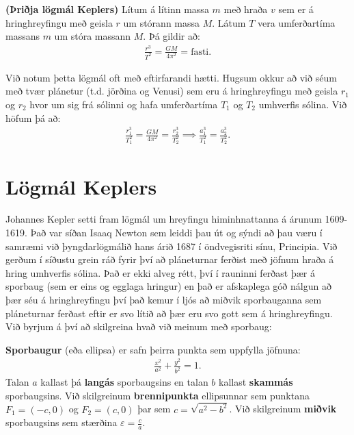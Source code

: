 \ifdefined \wholebook \else\documentclass[oneside]{book}\usepackage{EdlBook}\graphicspath{{figures/}}
\begin{document}
\begin{tcolorbox}
\begin{theorem}
    \textbf{(Þriðja lögmál Keplers)} Lítum á lítinn massa $m$ með hraða $v$ sem er á hringhreyfingu með geisla $r$ um stórann massa $M$. Látum $T$ vera umferðartíma massans $m$ um stóra massann $M$. Þá gildir að:
\begin{align*}
    \frac{r^3}{T^2} = \frac{GM}{4\pi^2} = \text{fasti}.
\end{align*}
\end{theorem}
\end{tcolorbox}

Við notum þetta lögmál oft með eftirfarandi hætti. Hugsum okkur að við séum með tvær plánetur (t.d. jörðina og Venusi) sem eru á hringhreyfingu með geisla $r_1$ og $r_2$ hvor um sig frá sólinni og hafa umferðartíma $T_1$ og $T_2$ umhverfis sólina. Við höfum þá að:
\begin{align*}
    \frac{r_1^3}{T_1^2} = \frac{GM}{4\pi^2} = \frac{r_2^3}{T_2^2} \implies \frac{a_1^3}{T_1^2} = \frac{a_2^3}{T_2^2}.
\end{align*}







\newpage

\section{Lögmál Keplers}


Johannes Kepler setti fram lögmál um hreyfingu himinhnattanna á árunum 1609-1619. Það var síðan Isaaq Newton sem leiddi þau út og sýndi að þau væru í samræmi við þyngdarlögmálið hans árið 1687 í öndvegisriti sínu, Principia. Við gerðum í síðustu grein ráð fyrir því að pláneturnar ferðist með jöfnum hraða á hring umhverfis sólina. Það er ekki alveg rétt, því í rauninni ferðast þær á sporbaug (sem er eins og egglaga hringur) en það er afskaplega góð nálgun að þær séu á hringhreyfingu því það kemur í ljós að miðvik sporbauganna sem pláneturnar ferðast eftir er svo lítið að þær eru svo gott sem á hringhreyfingu. Við byrjum á því að skilgreina hvað við meinum með sporbaug:

\begin{tcolorbox}
\begin{definition}
\textbf{Sporbaugur} (eða ellipsa) er safn þeirra punkta sem uppfylla jöfnuna:
\begin{align*}
    \frac{x^2}{a^2} + \frac{y^2}{b^2} = 1.
\end{align*}
Talan $a$ kallast þá \textbf{langás} sporbaugsins en talan $b$ kallast \textbf{skammás} sporbaugsins. Við skilgreinum \textbf{brennipunkta} ellipsunnar sem punktana $F_1 = (-c,0)$ og $F_2 = (c,0)$ þar sem $c =\sqrt{a^2 - b^2}$. Við skilgreinum \textbf{miðvik} sporbaugsins sem stærðina $ \varepsilon = \frac{c}{a}$.
\end{definition}
\end{tcolorbox}
\end{document}
